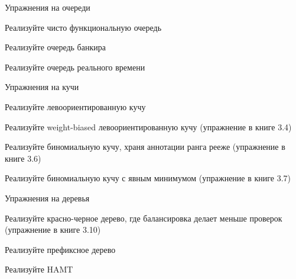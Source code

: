 \begin{frame}[allowframebreaks]{Упражнения на очереди}
\begin{exercise}
Реализуйте чисто функциональную очередь
\end{exercise}

\begin{exercise}
Реализуйте очередь банкира
\end{exercise}

\begin{exercise}
Реализуйте очередь реального времени
\end{exercise}
\end{frame}



\begin{frame}[allowframebreaks]{Упражнения на кучи}
\begin{exercise}
Реализуйте левоориентированную кучу
\end{exercise}

\begin{exercise}
Реализуйте weight-biased левоориентированную кучу (упражнение в книге 3.4)
\end{exercise}


\begin{exercise}
Реализуйте биномиальную кучу, храня аннотации ранга рееже (упражнение в книге 3.6)
\end{exercise}

\begin{exercise}
Реализуйте биномиальную кучу с явным минимумом (упражнение в книге 3.7)
\end{exercise}

\end{frame}


\begin{frame}[allowframebreaks]{Упражнения на деревья}
\begin{exercise}
Реализуйте красно-черное дерево, где балансировка делает меньше проверок (упражнение в книге 3.10)
\end{exercise}


\begin{exercise}
Реализуйте префиксное дерево
\end{exercise}

\begin{exercise}
Реализуйте HAMT
\end{exercise}

\end{frame}

